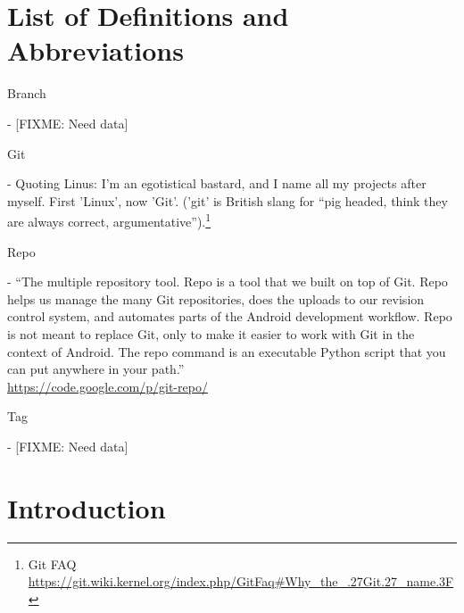 \documentclass[12pt,letterpaper,dvips]{article}
\newcommand{\FIXME}[1]{\textsf{[FIXME: #1]}}
\newenvironment{itemize*}%
  {\begin{itemize}%
    \setlength{\itemsep}{0pt}%
    \setlength{\parsep}{0pt}}%
  {\end{itemize}}
\begin{document}
\section{List of Definitions and Abbreviations}
\begin{itemize*}
  \item{\begin{bf}Branch\end{bf}} - \FIXME{Need data}
  \item{\begin{bf}Git\end{bf}} - Quoting Linus: I'm an egotistical bastard,
  and I name all my projects after myself. First 'Linux', now 'Git'.
('git' is British slang for ``pig headed, think they are always correct,
    argumentative'').\footnote{Git FAQ\\
    \href{https://git.wiki.kernel.org/index.php/GitFaq\#Why\_the\_.27Git.27\_name.3F}{https://git.wiki.kernel.org/index.php/GitFaq\#Why\_the\_.27Git.27\_name.3F}}
  \item{\begin{bf}Repo\end{bf}} - ``The multiple repository tool.
    Repo is a tool that we built on top of Git.  Repo helps us
    manage the many Git repositories, does the uploads to our
    revision control system, and automates parts of the Android
    development workflow.  Repo is not meant to replace Git,
    only to make it easier to work with Git in the context of
    Android.  The repo command is an executable Python script
    that you can put anywhere in your path.''\\
    \href{https://code.google.com/p/git-repo/}{https://code.google.com/p/git-repo/}
  \item{\begin{bf}Tag\end{bf}} - \FIXME{Need data}
\end{itemize*}


\newpage
\section{Introduction}
\end{document}
